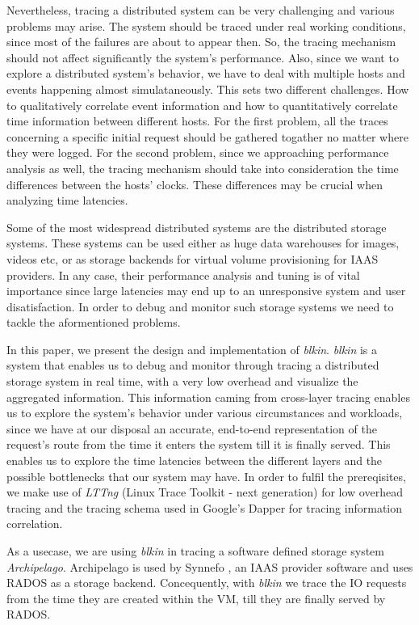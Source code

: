 \documentclass[a4paper,12pt]{article}
\begin{document}
Nevertheless, tracing a distributed system can be very challenging and various 
problems may arise. The system should be traced under real working conditions,
since most of the failures are about to appear then. So, the tracing mechanism
should not affect significantly the system's performance. Also, since we want to
explore a distributed system's behavior, we have to deal with multiple hosts and
events happening almost simulataneously. This sets two different challenges.
How to qualitatively correlate event information and how to quantitatively 
correlate time information between different hosts. For the first problem, all
the traces concerning a specific initial request should be gathered togather
no matter where they were logged. For the second problem, since we approaching 
performance analysis as well, the tracing mechanism should take into
consideration the time differences between the hosts' clocks. These differences
may be crucial when analyzing time latencies.

Some of the most widespread distributed systems are the distributed storage
systems. These systems can be used either as huge data warehouses for images,
videos etc, or as storage backends for virtual volume provisioning for IAAS 
providers. In any case, their performance analysis and tuning is of vital
importance since large latencies may end up to an unresponsive system and user
disatisfaction. In order to debug and monitor such storage systems we need to 
tackle the aformentioned problems.

In this paper, we present the design and implementation of \emph{blkin}.
\emph{blkin} is a system that enables us to debug and monitor through tracing
a distributed storage system in real time, with a very low overhead and 
visualize the aggregated information. This information caming from cross-layer 
tracing enables us to explore the system's behavior under various circumstances
and workloads, since we have at our disposal an accurate, end-to-end
representation of the request's route from the time it enters the system till
it is finally served. This enables us to explore the time latencies between the
different layers and the possible bottlenecks that our system may have. In order
to fulfil the prereqisites, we make use of \emph{LTTng} (Linux Trace Toolkit -
next generation)\cite{lttng} for low overhead tracing and the tracing schema
used in Google's Dapper for tracing information correlation.

As a usecase, we are using \emph{blkin} in tracing a software defined storage 
system \emph{Archipelago}\cite{archip}. Archipelago is used by Synnefo \cite{synnefo},
an IAAS provider software and uses RADOS\cite{rados} as a storage backend.
Concequently, with \emph{blkin} we trace the IO requests from the time they are
created within the VM, till they are finally served by RADOS.
\end{document}
